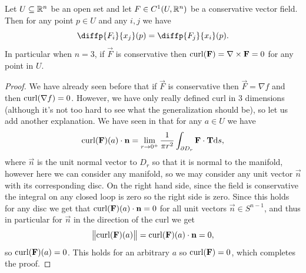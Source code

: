 \documentclass[11pt,a4paper]{article}
\begin{document}
\begin{corollary}
  \label{cor:locally-conservative-fields-identity}
  Let $U \subseteq \mathbb{R}^n$ be an open set and
  let $F \in C^1(U,\mathbb{R}^n)$ be a conservative vector field.
  Then for any point $p \in U$ and any $i,j$ we have
  \[
    \diffp{{F_i}}{{x_j}}(p) =
    \diffp{{F_j}}{{x_i}}(p).
  \]
  In particular when $n = 3$,
  if $\vec F$ is conservative then $\operatorname{curl}(\boldsymbol{\mathbf{F}}) = \nabla \times \boldsymbol{\mathbf{F}} = 0$
  for any point in $U$.
\end{corollary}
\begin{proof}
  We have already seen before that if $\vec F$ is conservative then
  $\vec F = \nabla f$ and then $\operatorname{curl}(\nabla f) = 0$.
  However, we have only really defined curl in $3$ dimensions (although
  it's not too hard to see what the generalization should be),
  so let us add another explanation.
  We have seen in  that for any $a \in U$
  we have
  \[
    \operatorname{curl}(\boldsymbol{\mathbf{F}})(a) \cdot \boldsymbol{\mathbf{n}} =
    \lim_{r \to 0^+}
    \frac{1}{\pi r^2} \int_{\partial D_r} \boldsymbol{\mathbf{F}} \cdot \boldsymbol{\mathbf{T}} \mathrm{d} s,
  \]
  where $\vec n$ is the unit normal vector to $D_r$ so that it is normal
  to the manifold,
  however here we can consider any manifold, so we may consider
  any unit vector $\vec n$ with its corresponding disc.
  On the right hand side, since the field is conservative
  the integral on any closed loop is zero so the right side is zero.
  Since this holds for any disc we get that $\operatorname{curl}(\boldsymbol{\mathbf{F}})(a) \cdot \boldsymbol{\mathbf{n}} = 0$
  for all unit vectors $\vec n \in S^{n-1}$,
  and thus in particular for $\vec n$ in the direction of the curl we get
  \[
    \left\lVert\operatorname{curl}(\boldsymbol{\mathbf{F}})(a)\right\rVert =
    \operatorname{curl}(\boldsymbol{\mathbf{F}})(a) \cdot \boldsymbol{\mathbf{n}} = 0,
  \]
  so $\operatorname{curl}(\boldsymbol{\mathbf{F}})(a) = 0$.
  This holds for an arbitrary $a$ so $\operatorname{curl}(\boldsymbol{\mathbf{F}}) = 0$,
  which completes the proof.
\end{proof}
\end{document}

